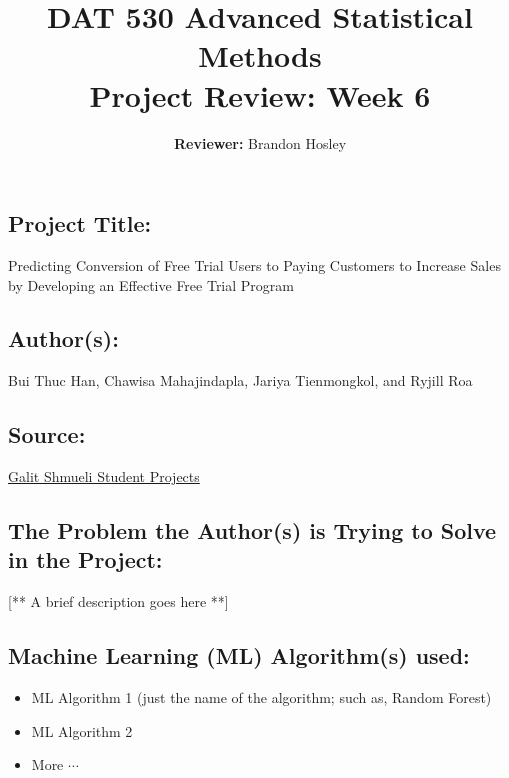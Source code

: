 \documentclass[]{article}
\title{\textbf{DAT 530 Advanced Statistical Methods}\\
	\normalsize{Project Review: Week 6} }
\author{\textbf{Reviewer: }
	Brandon Hosley}
\begin{document}
\setlength{\droptitle}{-10em} 
\pretitle{\begin{flushleft}\LARGE} %
	\posttitle{\end{flushleft}}
\preauthor{\begin{flushleft}\large} %
	\postauthor{\end{flushleft}}
\predate{\begin{flushleft}\large} %
	\postdate{\end{flushleft}}
\maketitle

\vspace{-2em}

\subsection*{Project Title:}
Predicting Conversion of Free Trial Users to Paying Customers
to Increase Sales by Developing an Effective Free Trial Program

\subsection*{Author(s):}
Bui Thuc Han,
Chawisa Mahajindapla,
Jariya Tienmongkol,
and Ryjill Roa

\subsection*{Source:}
\href{https://www.galitshmueli.com/data-mining-project/predicting-conversion-free-trial-users-paying-customers-increase-sales}{Galit Shmueli Student Projects}

\subsection*{The Problem the Author(s) is Trying to Solve in the Project:}
[** A brief description goes here **]

\subsection*{Machine Learning (ML) Algorithm(s) used:}
\begin{itemize}
	\item ML Algorithm 1 (just the name of the algorithm; such as, Random Forest)
	\item ML Algorithm 2
	\item More $\cdots$
\end{itemize}
\end{document}
